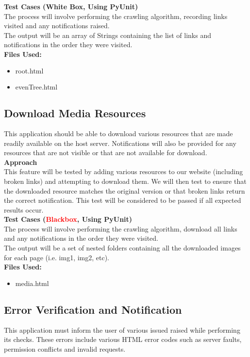 \documentclass[12pt, titlepage]{article}
\begin{document}
\textbf{Test Cases (White Box, Using PyUnit)}\\
The process will involve performing the crawling algorithm, recording links visited and any notifications raised.\\
The output will be an array of Strings containing the list of links and notifications in the order they were visited.\\

\textbf{Files Used:}
\begin{itemize}
\item root.html
\item evenTree.html
\end{itemize}

\subsection{Download Media Resources}
This application should be able to download various resources that are made readily available on the host server. Notifications will also be provided for any resources that are not visible or that are not available for download.\\

\textbf{Approach}\\
This feature will be tested by adding various resources to our website (including broken links) and attempting to download them. We will then test to ensure that the downloaded resource matches the original version or that broken links return the correct notification. This test will be considered to be passed if all expected results occur.\\

\textbf{Test Cases (\textcolor{red}{Blackbox}, Using PyUnit)}\\
The process will involve performing the crawling algorithm, download all links and any notifications in the order they were visited.\\
The output will be a set of nested folders containing all the downloaded images for each page (i.e. img1, img2, etc).\\

\textbf{Files Used:}
\begin{itemize}
\item media.html
\end{itemize}

\subsection{Error Verification and Notification}
This application must inform the user of various issued raised while performing its checks. These errors include various HTML error codes such as server faults, permission conflicts and invalid requests.\\
\end{document}
